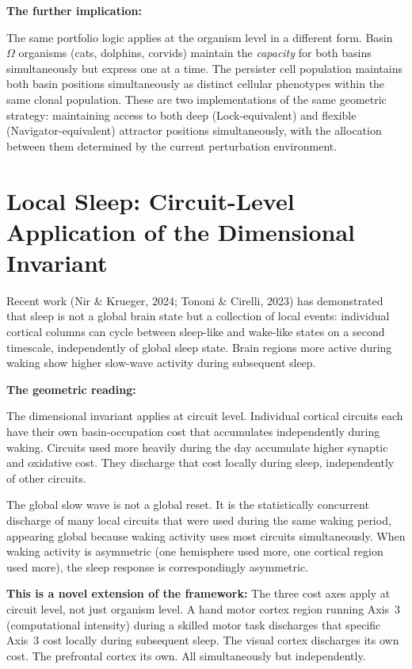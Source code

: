 \documentclass[10pt, a4paper]{article}
\begin{document}
\textbf{The further implication:}

The same portfolio logic applies at the
organism level in a different form.
Basin~$\Omega$ organisms (cats, dolphins,
corvids) maintain the \textit{capacity}
for both basins simultaneously but
express one at a time. The persister
cell population maintains both basin
positions simultaneously as distinct
cellular phenotypes within the same
clonal population. These are two
implementations of the same geometric
strategy: maintaining access to both
deep (Lock-equivalent) and flexible
(Navigator-equivalent) attractor positions
simultaneously, with the allocation
between them determined by the current
perturbation environment.

\section{Local Sleep: Circuit-Level
Application of the Dimensional Invariant}
\label{sec:local}

Recent work (Nir \& Krueger, 2024;
Tononi \& Cirelli, 2023) has demonstrated
that sleep is not a global brain state
but a collection of local events:
individual cortical columns can cycle
between sleep-like and wake-like states
on a second timescale, independently
of global sleep state. Brain regions
more active during waking show higher
slow-wave activity during subsequent
sleep.

\textbf{The geometric reading:}

The dimensional invariant applies at
circuit level. Individual cortical
circuits each have their own
basin-occupation cost that accumulates
independently during waking. Circuits
used more heavily during the day
accumulate higher synaptic and oxidative
cost. They discharge that cost locally
during sleep, independently of other
circuits.

The global slow wave is not a global
reset. It is the statistically concurrent
discharge of many local circuits that
were used during the same waking period,
appearing global because waking activity
uses most circuits simultaneously. When
waking activity is asymmetric (one
hemisphere used more, one cortical
region used more), the sleep response
is correspondingly asymmetric.

\textbf{This is a novel extension of
the framework:} The three cost axes
apply at circuit level, not just organism
level. A hand motor cortex region running
Axis~3 (computational intensity) during
a skilled motor task discharges that
specific Axis~3 cost locally during
subsequent sleep. The visual cortex
discharges its own cost. The prefrontal
cortex its own. All simultaneously but
independently.
\end{document}
